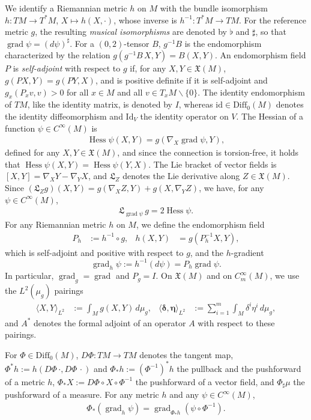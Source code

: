 \documentclass{article}
\theoremstyle{remark}
\newcommand{\M}{M}
\newcommand{\Cinf}{C^{\infty}(\M)}
\newcommand{\CinfV}[1]{C_{#1}^{\infty}(\M)}
\newcommand{\X}{\mathfrak{X}(\M)}
\newcommand{\Diff}{\mathrm{Diff}_0(\M)}
\DeclareMathOperator{\grad}{\mathrm{grad}}
\DeclareMathOperator{\Hess}{Hess}
\begin{document}
%
We identify a Riemannian metric $h$ on $\M$ with the bundle isomorphism $h:T\M\rightarrow T^*\M$, $X\mapsto h(X,\cdot)$, whose inverse is $h^{-1}:T^*\M\rightarrow T\M$. For the reference metric $g$, the resulting \emph{musical isomorphisms} are denoted by $\flat$ and $\sharp$, so that $\grad\psi=(d\psi)^\sharp$. For a $(0,2)$-tensor $B$, $g^{-1}B$ is the endomorphism characterized by the relation $g(g^{-1}B\,X,Y)=B(X,Y)$. An endomorphism field $P$ is \emph{self-adjoint} with respect to $g$ if, for any $X,Y\in\X$, $g(PX,Y) = g(PY,X)$, and is positive definite if it is self-adjoint and $g_x(P_xv,v)>0$ for all $x\in\M$ and all $v\in T_x\M\backslash\{0\}$. The identity endomorphism of $T\M$, like the identity matrix, is denoted by $I$, whereas $\mathrm{id}\in\Diff$ denotes the identity diffeomorphism and $\mathrm{Id}_V$ the identity operator on $V$.
%
The Hessian of a function $\psi\in\Cinf$ is
%
\begin{align*}
    \Hess\psi(X,Y) = g(\nabla_X\grad\psi,Y),
\end{align*}
%
defined for any $X,Y\in \X$, and since the connection is torsion-free, it holds that $\Hess\psi(X,Y) = \Hess\psi(Y,X)$. The Lie bracket of vector fields is 
%
$[X,Y]=\nabla_XY-\nabla_YX$, and $\mathfrak{L}_Z$ denotes the Lie derivative along $Z\in\X$. Since $(\mathfrak{L}_Zg)(X,Y)=g(\nabla_XZ,Y)+g(X,\nabla_YZ)$, we have, for any $\psi\in\Cinf$,
%
\begin{align}\label{eq:killing}
    \mathfrak{L}_{\grad\psi}\,g=2\Hess\psi.
\end{align}
%
For any Riemannian metric $h$ on $\M$, we define the endomorphism field
%
\begin{align*}
    P_h&:=h^{-1}\circ g, & h(X,Y)&=g(P_h^{-1}X,Y),
\end{align*}
%
which is self-adjoint and positive with respect to $g$, and the $h$-gradient 
\[\grad_h\psi:=h^{-1}(d\psi)=P_h\grad\psi.\]
In particular, $\grad_g=\grad$ and $P_g=I$. On $\X$ and on $\CinfV{m}$, we use the $L^2(\mu_g)$ pairings
%
\begin{align*}
    \langle X,Y\rangle_{L^2}&:=\textstyle\int_{\M}g(X,Y)\,d\mu_g, & \langle\bm{\delta},\bm{\eta}\rangle_{L^2}&:=\textstyle\sum_{i=1}^{m}\int_{\M}\delta^i\eta^i\,d\mu_g,
\end{align*}
%
and $A^*$ denotes the formal adjoint of an operator $A$ with respect to these pairings.
%

%
For $\Phi\in\Diff$, $D\Phi:T\M\rightarrow T\M$ denotes the tangent map, $\Phi^*h:=h(D\Phi\,\cdot,D\Phi\,\cdot)$ and $\Phi_*h:=(\Phi^{-1})^*h$ the pullback and the pushforward of a metric $h$, $\Phi_*X:=D\Phi\circ X\circ\Phi^{-1}$ the pushforward of a vector field, and $\Phi_\sharp\mu$ the pushforward of a measure. For any metric $h$ and any $\psi\in\Cinf$,
%
\begin{align}\label{eq:naturality}
    \Phi_*(\grad_h\psi)=\grad_{\Phi_*h}(\psi\circ\Phi^{-1}).
\end{align}
%
\end{document}
